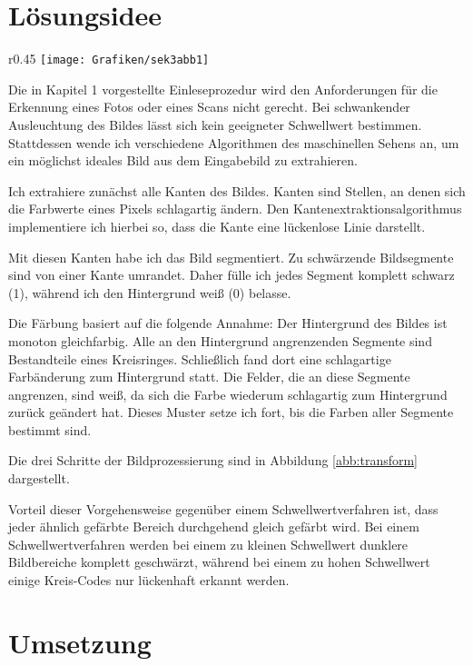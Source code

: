 \section{Lösungsidee}
\begin{wrapfigure}{r}{0.45\textwidth}
	\setlength\intextsep{0pt}
	\centering	
	\texttt{[image: Grafiken/sek3abb1]}
	\caption{Verbesserte Bilderkennung}
	\label{abb:transform}
\end{wrapfigure}
Die in Kapitel 1 vorgestellte Einleseprozedur wird den Anforderungen für die Erkennung eines Fotos oder eines Scans nicht gerecht. Bei schwankender Ausleuchtung des Bildes lässt sich kein geeigneter Schwellwert bestimmen. Stattdessen wende ich verschiedene Algorithmen des maschinellen Sehens an, um ein möglichst ideales Bild aus dem Eingabebild zu extrahieren.

Ich extrahiere zunächst alle Kanten des Bildes. Kanten sind Stellen, an denen sich die Farbwerte eines Pixels schlagartig ändern. Den Kantenextraktionsalgorithmus implementiere ich hierbei so, dass die Kante eine lückenlose Linie darstellt.

Mit diesen Kanten habe ich das Bild segmentiert. Zu schwärzende Bildsegmente sind von einer Kante umrandet. Daher fülle ich jedes Segment komplett schwarz (1), während ich den Hintergrund weiß (0) belasse.

Die Färbung basiert auf die folgende Annahme: Der Hintergrund des Bildes ist monoton gleichfarbig. Alle an den Hintergrund angrenzenden Segmente sind Bestandteile eines Kreisringes. Schließlich fand dort eine schlagartige Farbänderung zum Hintergrund statt. Die Felder, die an diese Segmente angrenzen, sind weiß, da sich die Farbe wiederum schlagartig zum Hintergrund zurück geändert hat. Dieses Muster setze ich fort, bis die Farben aller Segmente bestimmt sind.

Die drei Schritte der Bildprozessierung sind in Abbildung \ref{abb:transform} dargestellt.

Vorteil dieser Vorgehensweise gegenüber einem Schwellwertverfahren ist, dass jeder ähnlich gefärbte Bereich durchgehend gleich gefärbt wird. Bei einem Schwellwertverfahren werden bei einem zu kleinen Schwellwert dunklere Bildbereiche komplett geschwärzt, während bei einem zu hohen Schwellwert einige Kreis-Codes nur lückenhaft erkannt werden.
 
\section{Umsetzung}

